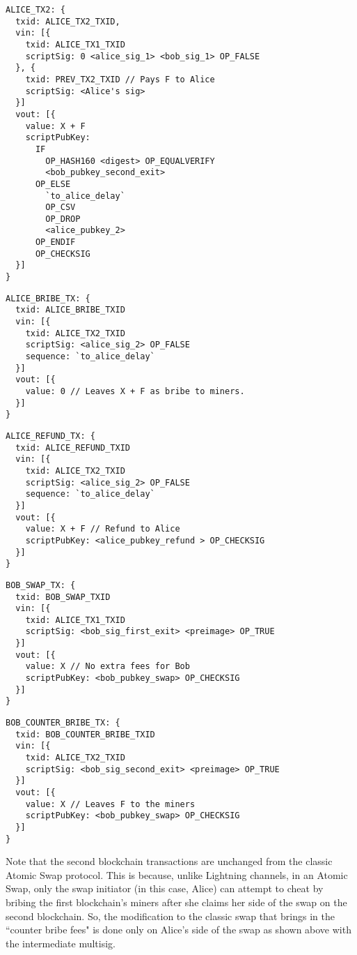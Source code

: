 \documentclass[runningheads]{llncs}
\begin{document}
\begin{subappendices}
\begin{lstlisting}
ALICE_TX2: {
  txid: ALICE_TX2_TXID,
  vin: [{
    txid: ALICE_TX1_TXID
    scriptSig: 0 <alice_sig_1> <bob_sig_1> OP_FALSE
  }, {
    txid: PREV_TX2_TXID // Pays F to Alice
    scriptSig: <Alice's sig>
  }]
  vout: [{
    value: X + F
    scriptPubKey: 
      IF
        OP_HASH160 <digest> OP_EQUALVERIFY
        <bob_pubkey_second_exit>
      OP_ELSE
        `to_alice_delay`
        OP_CSV
        OP_DROP
        <alice_pubkey_2>
      OP_ENDIF
      OP_CHECKSIG
  }]
}
\end{lstlisting}

\begin{lstlisting}
ALICE_BRIBE_TX: {
  txid: ALICE_BRIBE_TXID
  vin: [{
    txid: ALICE_TX2_TXID
    scriptSig: <alice_sig_2> OP_FALSE
    sequence: `to_alice_delay`
  }]
  vout: [{
    value: 0 // Leaves X + F as bribe to miners.
  }]
}
\end{lstlisting}

\begin{lstlisting}
ALICE_REFUND_TX: {
  txid: ALICE_REFUND_TXID
  vin: [{
    txid: ALICE_TX2_TXID
    scriptSig: <alice_sig_2> OP_FALSE
    sequence: `to_alice_delay`
  }]
  vout: [{
    value: X + F // Refund to Alice
    scriptPubKey: <alice_pubkey_refund > OP_CHECKSIG
  }]
}
\end{lstlisting}

\begin{lstlisting}
BOB_SWAP_TX: {
  txid: BOB_SWAP_TXID
  vin: [{
    txid: ALICE_TX1_TXID
    scriptSig: <bob_sig_first_exit> <preimage> OP_TRUE
  }]
  vout: [{
    value: X // No extra fees for Bob
    scriptPubKey: <bob_pubkey_swap> OP_CHECKSIG
  }]
}
\end{lstlisting}

\begin{lstlisting}
BOB_COUNTER_BRIBE_TX: {
  txid: BOB_COUNTER_BRIBE_TXID
  vin: [{
    txid: ALICE_TX2_TXID
    scriptSig: <bob_sig_second_exit> <preimage> OP_TRUE
  }]
  vout: [{
    value: X // Leaves F to the miners
    scriptPubKey: <bob_pubkey_swap> OP_CHECKSIG
  }]
}
\end{lstlisting}

Note that the second blockchain transactions are unchanged from the classic Atomic Swap protocol. This is because, unlike Lightning channels, in an Atomic Swap, only the swap initiator (in this case, Alice) can attempt to cheat by bribing the first blockchain's miners after she claims her side of the swap on the second blockchain. So, the modification to the classic swap that brings in the ``counter bribe fees" is done only on Alice's side of the swap as shown above with the intermediate multisig.



\end{subappendices}
\end{document}
